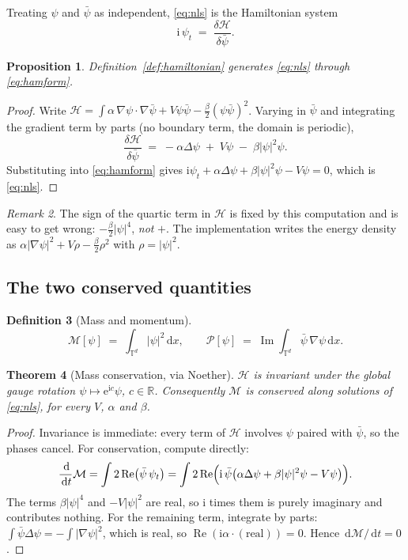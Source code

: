 \documentclass[11pt,a4paper]{article}
\theoremstyle{plain}
\newtheorem{theorem}{Theorem}[section]
\newtheorem{proposition}[theorem]{Proposition}
\theoremstyle{definition}
\newtheorem{definition}[theorem]{Definition}
\theoremstyle{remark}
\newtheorem{remark}[theorem]{Remark}
\newcommand{\R}{\mathbb{R}}
\newcommand{\T}{\mathbb{T}}
\newcommand{\iu}{\mathrm{i}}
\newcommand{\eu}{\mathrm{e}}
\newcommand{\dd}{\,\mathrm{d}}
\newcommand{\lap}{\Delta}
\newcommand{\Ham}{\mathcal{H}}
\newcommand{\Mass}{\mathcal{M}}
\newcommand{\Mom}{\mathcal{P}}
\DeclareMathOperator{\Imag}{Im}
\DeclareMathOperator{\Real}{Re}
\begin{document}
Treating $\psi$ and $\bar\psi$ as independent, \eqref{eq:nls} is the Hamiltonian system
\begin{equation}
\label{eq:hamform}
\iu\,\psi_t \;=\; \frac{\delta\Ham}{\delta\bar\psi}.
\end{equation}

\begin{proposition}
\label{prop:hamform}
Definition~\ref{def:hamiltonian} generates \eqref{eq:nls} through \eqref{eq:hamform}.
\end{proposition}

\begin{proof}
Write $\Ham = \int \alpha\,\nabla\psi\cdot\nabla\bar\psi + V\psi\bar\psi - \tfrac{\beta}{2}(\psi\bar\psi)^2$.
Varying in $\bar\psi$ and integrating the gradient term by parts (no boundary term, the
domain is periodic),
\[
\frac{\delta\Ham}{\delta\bar\psi} \;=\; -\alpha\lap\psi \;+\; V\psi \;-\; \beta|\psi|^2\psi .
\]
Substituting into \eqref{eq:hamform} gives $\iu\psi_t + \alpha\lap\psi + \beta|\psi|^2\psi - V\psi = 0$,
which is \eqref{eq:nls}.
\end{proof}

\begin{remark}
The sign of the quartic term in $\Ham$ is fixed by this computation and is easy to get
wrong: $-\tfrac{\beta}{2}|\psi|^4$, \emph{not} $+$. The implementation writes the energy
density as $\alpha|\nabla\psi|^2 + V\rho - \tfrac{\beta}{2}\rho^2$ with $\rho=|\psi|^2$.
\end{remark}

\subsection{The two conserved quantities}

\begin{definition}[Mass and momentum]
\[
\Mass[\psi] \;=\; \int_{\T^d}|\psi|^2\dd x,
\qquad
\Mom[\psi] \;=\; \Imag\int_{\T^d}\bar\psi\,\nabla\psi\dd x .
\]
\end{definition}

\begin{theorem}[Mass conservation, via Noether]
\label{thm:mass}
$\Ham$ is invariant under the global gauge rotation $\psi\mapsto \eu^{\iu c}\psi$,
$c\in\R$. Consequently $\Mass$ is conserved along solutions of \eqref{eq:nls}, for every
$V$, $\alpha$ and $\beta$.
\end{theorem}

\begin{proof}
Invariance is immediate: every term of $\Ham$ involves $\psi$ paired with $\bar\psi$, so
the phases cancel. For conservation, compute directly:
\[
\frac{\dd}{\dd t}\Mass
= \int 2\Real\bigl(\bar\psi\,\psi_t\bigr)
= \int 2\Real\Bigl(\iu\,\bar\psi\bigl(\alpha\lap\psi + \beta|\psi|^2\psi - V\psi\bigr)\Bigr).
\]
The terms $\beta|\psi|^4$ and $-V|\psi|^2$ are real, so $\iu$ times them is purely
imaginary and contributes nothing. For the remaining term, integrate by parts:
$\int \bar\psi\lap\psi = -\int|\nabla\psi|^2$, which is real, so
$\Real(\iu\alpha\cdot(\text{real}))=0$. Hence $\dd\Mass/\dd t = 0$.
\end{proof}
\end{document}
